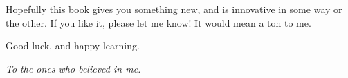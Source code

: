 Hopefully this book gives you something new, and is innovative in some way or the other. If you like it, please 
let me know! It would mean a ton to me.

Good luck, and happy learning.

\clearpage
{}
\thispagestyle{empty}
    \vspace*{\fill}
    \begin{center}
        {\em To the ones who believed in me.}
    \end{center}
    \vspace*{\fill}
\restoregeometry